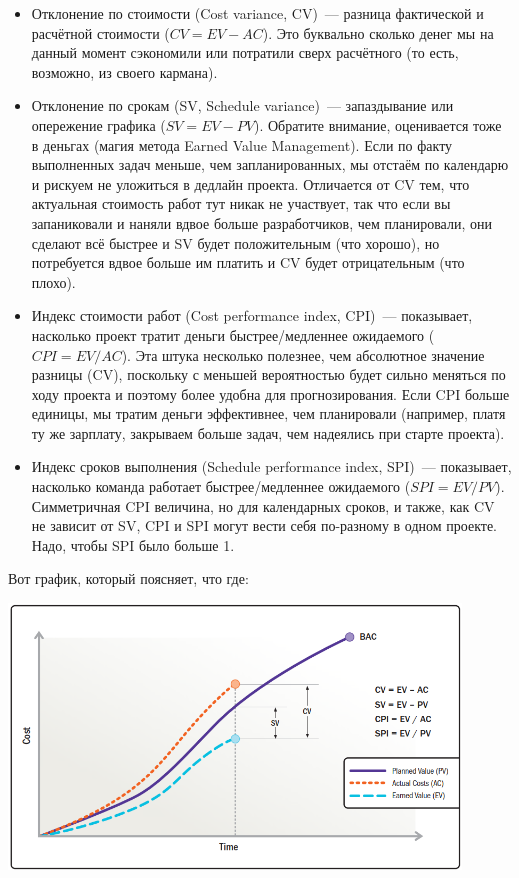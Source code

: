\documentclass{../../text-style}
\begin{document}
\begin{itemize}
    \item Отклонение по стоимости (Cost variance, CV)~--- разница фактической и расчётной стоимости ($CV = EV - AC$). Это буквально сколько денег мы на данный момент сэкономили или потратили сверх расчётного (то есть, возможно, из своего кармана).
    \item Отклонение по срокам (SV, Schedule variance)~--- запаздывание или опережение графика ($SV = EV - PV$). Обратите внимание, оценивается тоже в деньгах (магия метода Earned Value Management). Если по факту выполненных задач меньше, чем запланированных, мы отстаём по календарю и рискуем не уложиться в дедлайн проекта. Отличается от CV тем, что актуальная стоимость работ тут никак не участвует, так что если вы запаниковали и наняли вдвое больше разработчиков, чем планировали, они сделают всё быстрее и SV будет положительным (что хорошо), но потребуется вдвое больше им платить и CV будет отрицательным (что плохо).
    \item Индекс стоимости работ (Cost performance index, CPI)~--- показывает, насколько проект тратит деньги быстрее/медленнее ожидаемого ($CPI = EV / AC$). Эта штука несколько полезнее, чем абсолютное значение разницы (CV), поскольку с меньшей вероятностью будет сильно меняться по ходу проекта и поэтому более удобна для прогнозирования. Если CPI больше единицы, мы тратим деньги эффективнее, чем планировали (например, платя ту же зарплату, закрываем больше задач, чем надеялись при старте проекта).
    \item Индекс сроков выполнения (Schedule performance index, SPI)~--- показывает, насколько команда работает быстрее/медленнее ожидаемого ($SPI = EV / PV$). Симметричная CPI величина, но для календарных сроков, и также, как CV не зависит от SV, CPI и SPI могут вести себя по-разному в одном проекте. Надо, чтобы SPI было больше 1.
\end{itemize}

Вот график, который поясняет, что где:

\begin{center}
    \includegraphics[width=0.9\textwidth]{svCvMetricsGraph.png}
\end{center}
\end{document}
